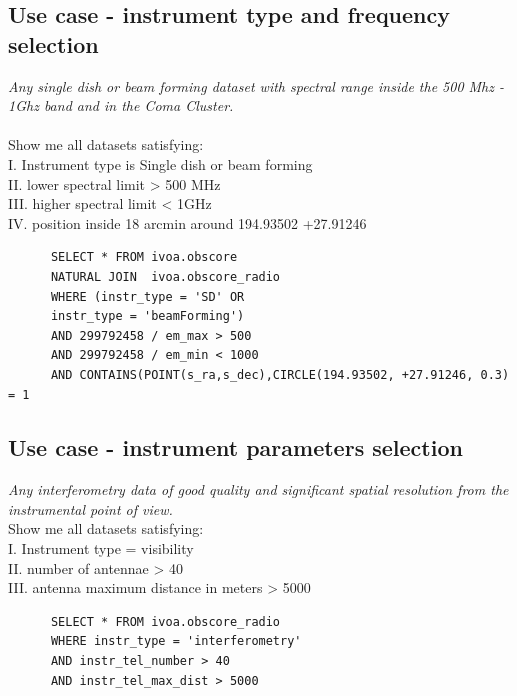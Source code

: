 \subsection{Use case - instrument type and frequency selection }
\textit{Any single dish or beam forming dataset  with spectral range inside the 500 Mhz - 1Ghz band and in the Coma Cluster.}\\ \\
Show me all datasets satisfying:\\
I. Instrument type is Single dish or beam forming \\
II. lower spectral limit > 500 MHz \\
III. higher spectral limit < 1GHz \\
IV. position inside 18 arcmin around 194.93502 +27.91246

\begin{verbatim}
      SELECT * FROM ivoa.obscore 
      NATURAL JOIN  ivoa.obscore_radio
      WHERE (instr_type = 'SD' OR
      instr_type = 'beamForming') 
      AND 299792458 / em_max > 500 
      AND 299792458 / em_min < 1000 
      AND CONTAINS(POINT(s_ra,s_dec),CIRCLE(194.93502, +27.91246, 0.3) = 1     
\end{verbatim}



\subsection{Use case - instrument parameters selection }
\textit{Any interferometry data of good quality and significant spatial resolution from the instrumental point of view. }\\ 
Show me all datasets satisfying:\\
I. Instrument type = visibility \\
II. number of antennae > 40 \\
III. antenna maximum distance in meters  > 5000 
\begin{verbatim}
      SELECT * FROM ivoa.obscore_radio
      WHERE instr_type = 'interferometry' 
      AND instr_tel_number > 40 
      AND instr_tel_max_dist > 5000 
\end{verbatim}



